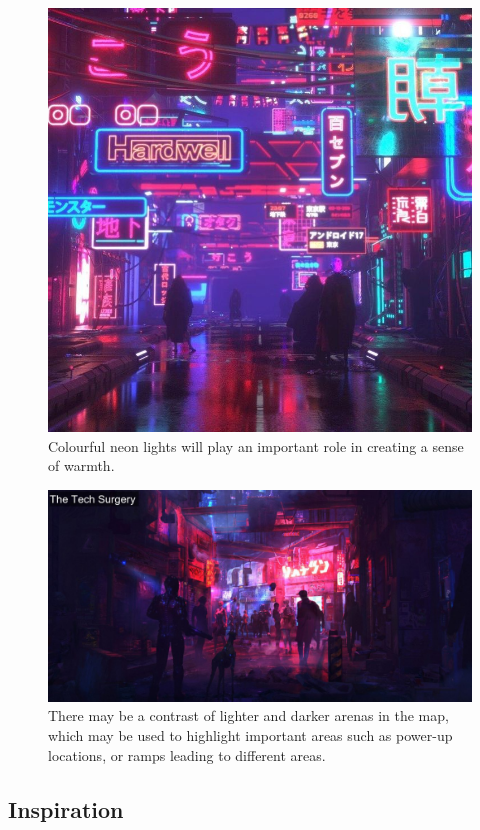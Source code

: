 \documentclass{article}
\theoremstyle{definition}
\begin{document}
\begin{figure}[htpb]
  \centering
  \includegraphics[width=0.8\linewidth]{theme02.jpg}
  \caption{Colourful neon lights will play an important role in creating
  a sense of warmth.}
\label{fig:theme02}
\end{figure}

\begin{figure}[htpb]
  \centering
  \includegraphics[width=0.8\linewidth]{theme03.jpg}
  \caption{There may be a contrast of lighter and darker arenas in the map,
  which may be used to highlight important areas such as power-up locations, or
ramps leading to different areas.}
\label{fig:theme03}
\end{figure}

\subsection{Inspiration}
\end{document}
